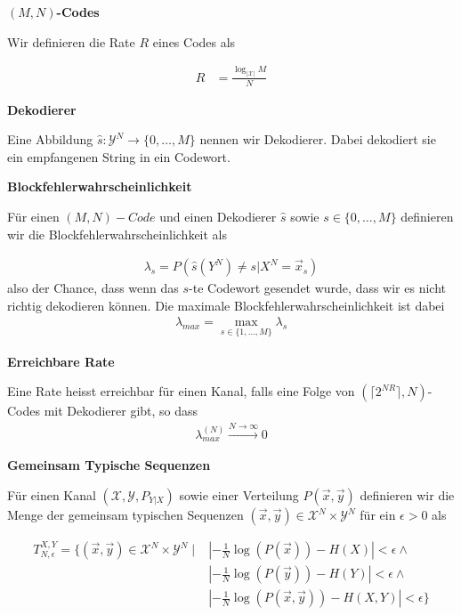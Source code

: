 \documentclass[25pt]{sciposter}
\renewcommand{\hat}{\widehat}
\newenvironment{defn}[1]{\begin{mdframed}[backgroundcolor=blue!10,innertopmargin=15pt, nobreak=true,innerbottommargin=15pt]
		\textbf{#1 }
	}
	{ 
	\end{mdframed}
}
\begin{document}
\begin{multicols}{3}
\begin{defn}{$(M,N)$-Codes}
Wir definieren die Rate $R$ eines Codes als

\begin{align*}
	R &= \frac{\log_{|\mathcal{X}|} M }{N}
\end{align*}

\end{defn}



\begin{defn}{Dekodierer}
	Eine Abbildung $\hat{s}:\mathcal{Y}^N \to \{0,\ldots,M\}$ nennen wir Dekodierer. Dabei dekodiert sie ein empfangenen String in ein Codewort.
\end{defn}

\begin{defn}{Blockfehlerwahrscheinlichkeit}
	Für einen $(M,N)-Code$ und einen Dekodierer $\hat{s}$ sowie $s\in \{0,\ldots,M\}$ definieren wir die Blockfehlerwahrscheinlichkeit als
	
	\begin{align*}
		\lambda_s = P (\hat{s}(Y^N)\neq s | X^N = \vec{x}_s)
	\end{align*}
	also der Chance, dass wenn das $s$-te Codewort gesendet wurde, dass wir es nicht richtig dekodieren können.
	Die maximale Blockfehlerwahrscheinlichkeit ist dabei \begin{align*}
		\lambda_{max} = \max_{s\in\{1,\ldots,M\}} \lambda_s
	\end{align*}
\end{defn}


\begin{defn}{Erreichbare Rate}
	Eine Rate heisst erreichbar für einen Kanal, falls eine Folge von $(\lceil  2^{NR}\rceil,N)$-Codes mit Dekodierer gibt, so dass\begin{align*}
		 \lambda_{max}^{(N)} \stackrel{N \to \infty}{\longrightarrow} 0
	\end{align*}
\end{defn}



\begin{defn}{Gemeinsam Typische Sequenzen}
	Für einen Kanal $(\mathcal{X}, \mathcal{Y}, P_{Y|X})$ sowie einer Verteilung $P(\vec{x}, \vec{y})$ definieren wir die Menge der gemeinsam typischen Sequenzen $(\vec{x},\vec{y}) \in \mathcal{X}^N \times \mathcal{Y}^N$ für ein $\epsilon > 0$ als 
	
	\begin{align*}
		T_{N,\epsilon}^{X,Y} = \{(\vec{x}, \vec{y}) \in \mathcal{X}^N \times \mathcal{Y}^N \mid &\left|-\frac{1}{N}\log(P(\vec{x})) - H(X)\right| < \epsilon \land \\
		&\left|-\frac{1}{N}\log(P(\vec{y})) - H(Y)\right| < \epsilon \land\\
		&\left|-\frac{1}{N}\log(P(\vec{x},\vec{y})) - H(X,Y)\right| < \epsilon\}
	\end{align*}
\end{defn}




\end{multicols}
\end{document}
